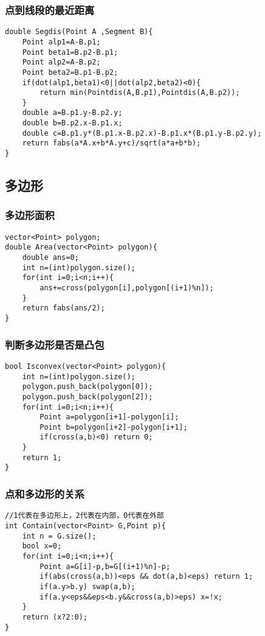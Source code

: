 \documentclass[twocolumn,a4]{article}
\begin{document}
\subsubsection{点到线段的最近距离}
\begin{lstlisting}
double Segdis(Point A ,Segment B){
    Point alp1=A-B.p1;
    Point beta1=B.p2-B.p1;
    Point alp2=A-B.p2;
    Point beta2=B.p1-B.p2;
    if(dot(alp1,beta1)<0||dot(alp2,beta2)<0){
        return min(Pointdis(A,B.p1),Pointdis(A,B.p2));
    }
    double a=B.p1.y-B.p2.y;
    double b=B.p2.x-B.p1.x;
    double c=B.p1.y*(B.p1.x-B.p2.x)-B.p1.x*(B.p1.y-B.p2.y);
    return fabs(a*A.x+b*A.y+c)/sqrt(a*a+b*b);
}
\end{lstlisting}
\subsection{多边形}
\subsubsection{多边形面积}
\begin{lstlisting}
vector<Point> polygon;
double Area(vector<Point> polygon){
    double ans=0;
    int n=(int)polygon.size();
    for(int i=0;i<n;i++){
        ans+=cross(polygon[i],polygon[(i+1)%n]);
    }
    return fabs(ans/2);
}
\end{lstlisting}
\subsubsection{判断多边形是否是凸包}
\begin{lstlisting}
bool Isconvex(vector<Point> polygon){
    int n=(int)polygon.size();
    polygon.push_back(polygon[0]);
    polygon.push_back(polygon[2]);
    for(int i=0;i<n;i++){
        Point a=polygon[i+1]-polygon[i];
        Point b=polygon[i+2]-polygon[i+1];
        if(cross(a,b)<0) return 0;
    }
    return 1;
}
\end{lstlisting}
\subsubsection{点和多边形的关系}
\begin{lstlisting}
//1代表在多边形上，2代表在内部，0代表在外部
int Contain(vector<Point> G,Point p){
    int n = G.size();
    bool x=0;
    for(int i=0;i<n;i++){
        Point a=G[i]-p,b=G[(i+1)%n]-p;
        if(abs(cross(a,b))<eps && dot(a,b)<eps) return 1;
        if(a.y>b.y) swap(a,b);
        if(a.y<eps&&eps<b.y&&cross(a,b)>eps) x=!x;
    }
    return (x?2:0);
}
\end{lstlisting}
\end{document}

